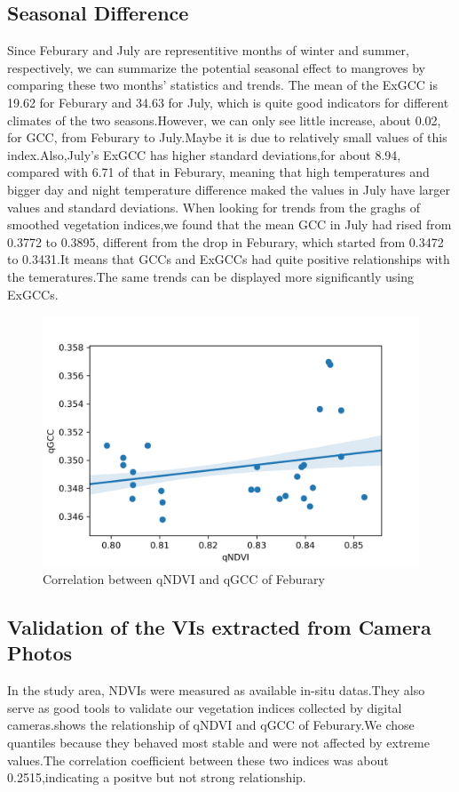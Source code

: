 \documentclass{article}
\begin{document}
\subsection{Seasonal Difference}
Since Feburary and July are representitive months of winter and summer, respectively, we can summarize the potential seasonal effect to mangroves by comparing these two months' statistics and trends.
The mean of the ExGCC is 19.62 for Feburary and 34.63 for July, which is quite good indicators for different climates of the two seasons.However, we can only see little increase, about 0.02, for GCC, from Feburary to July.Maybe it is due to relatively small values of this index.Also,July's ExGCC has higher standard deviations,for about 8.94, compared with 6.71 of that in Feburary, meaning that high temperatures and bigger day and night temperature difference maked the values in July have larger values and standard deviations.
When looking for trends from the graghs of smoothed vegetation indices,we found that the mean GCC in July had rised from 0.3772 to 0.3895, different from the drop in Feburary, which started from 0.3472 to 0.3431.It means that GCCs and ExGCCs had quite positive relationships with the temeratures.The same trends can be displayed more significantly using ExGCCs.

\begin{figure}
  \centering
  \includegraphics[width=1\textwidth]{pictures/Febqndvi qgcc.png}
  \caption{Correlation between qNDVI and qGCC of Feburary}
  \label{fig:fig3}
\end{figure}

\subsection{Validation of the VIs extracted from Camera Photos}
In the study area, NDVIs were measured as available in-situ datas.They also serve as good tools to validate our vegetation indices collected by digital cameras.shows the relationship of qNDVI and qGCC of Feburary.We chose quantiles because they behaved most stable and were not affected by extreme values.The correlation coefficient between these two indices was about 0.2515,indicating a positve but not strong relationship.
\end{document}
